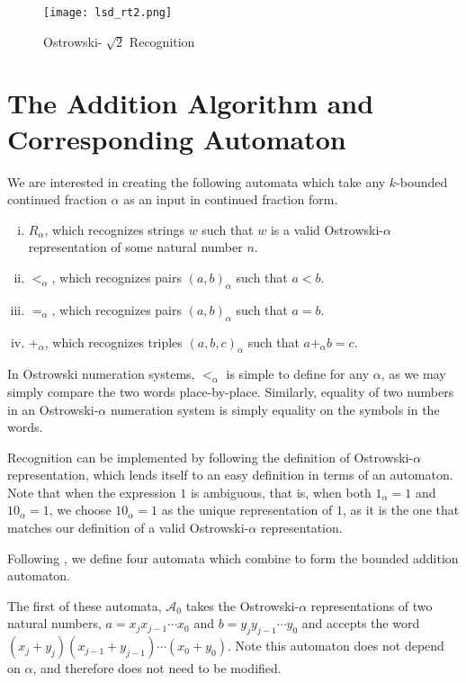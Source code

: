 \documentclass[a4paper]{article}
\newcommand{\word}{word\xspace}
\newcommand{\letter}{symbol\xspace}
\theoremstyle{definition}
\theoremstyle{remark}
\theoremstyle{remark}
\theoremstyle{plain}
\begin{document}
\begin{figure}[h]
	\centering
    \texttt{[image: lsd\_rt2.png]}
    \caption{Ostrowski-$\sqrt[~]{2}$ Recognition}
    \label{fig:lsd_rt2}
\end{figure}


\section{The Addition Algorithm and Corresponding Automaton}


We are interested in creating the following automata which take any $k$-bounded continued fraction $\alpha$ as an input in continued fraction form.

\begin{enumerate}[(i)]
    \item $R_{\alpha}$, which recognizes strings $w$ such that $w$ is a valid Ostrowski-$\alpha$ representation of some natural number $n$.
    \item $<_{\alpha}$, which recognizes pairs $(a,b)_{\alpha}$ such that $a < b$.
    \item $=_{\alpha}$, which recognizes pairs $(a,b)_{\alpha}$ such that $a = b$.
    \item $+_{\alpha}$, which recognizes triples $(a,b,c)_{\alpha}$ such that $a +_{\alpha} b = c$.
\end{enumerate}

In Ostrowski numeration systems, $<_{\alpha}$ is simple to define for any $\alpha$, as we may simply compare the two \word{}s place-by-place.
Similarly, equality of two numbers in an Ostrowski-$\alpha$ numeration system is simply equality on the \letter{}s in the \word{}s.

Recognition can be implemented by following the definition of Ostrowski-$\alpha$ representation, which lends itself to an easy definition in terms of an automaton.
Note that when the expression $1$ is ambiguous, that is, when both $1_{\alpha} = 1$ and $10_{\alpha} = 1$, we choose $10_{\alpha} = 1$ as the unique representation of $1$, as it is the one that matches our definition of a valid Ostrowski-$\alpha$ representation.

Following \citeauthor{ht-ostrowski}, we define four automata which combine to form the bounded addition automaton.

The first of these automata, $\mathcal{A}_0$ takes the Ostrowski-$\alpha$ representations of two natural numbers, $a = x_j x_{j-1} \cdots x_0$ and $b = y_j y_{j-1} \cdots y_0$ and accepts the word $(x_j + y_j) (x_{j-1} + y_{j-1}) \cdots (x_0 + y_0)$.
Note this automaton does not depend on $\alpha$, and therefore does not need to be modified.
\end{document}

